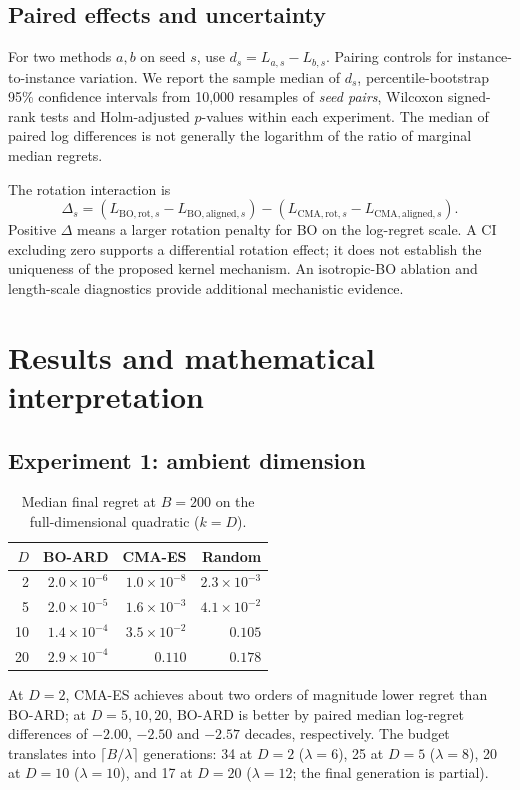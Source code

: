 \documentclass[11pt,a4paper]{article}
\begin{document}
\subsection{Paired effects and uncertainty}
For two methods $a,b$ on seed $s$, use $d_s=L_{a,s}-L_{b,s}$. Pairing controls for instance-to-instance variation. We report the sample median of $d_s$, percentile-bootstrap 95\% confidence intervals from 10,000 resamples of \emph{seed pairs}, Wilcoxon signed-rank tests and Holm-adjusted $p$-values within each experiment. The median of paired log differences is not generally the logarithm of the ratio of marginal median regrets.

The rotation interaction is
\begin{equation}\label{eq:interaction}
\Delta_s=(L_{\mathrm{BO,rot},s}-L_{\mathrm{BO,aligned},s})-(L_{\mathrm{CMA,rot},s}-L_{\mathrm{CMA,aligned},s}).
\end{equation}
Positive $\Delta$ means a larger rotation penalty for BO on the log-regret scale. A CI excluding zero supports a differential rotation effect; it does not establish the uniqueness of the proposed kernel mechanism. An isotropic-BO ablation and length-scale diagnostics provide additional mechanistic evidence.

\section{Results and mathematical interpretation}
\subsection{Experiment 1: ambient dimension}
\begin{table}[H]\centering\caption{Median final regret at $B=200$ on the full-dimensional quadratic ($k=D$).}\begin{tabular}{rrrr}\toprule $D$&BO-ARD&CMA-ES&Random\\\midrule 2&$2.0\times10^{-6}$&$1.0\times10^{-8}$&$2.3\times10^{-3}$\\5&$2.0\times10^{-5}$&$1.6\times10^{-3}$&$4.1\times10^{-2}$\\10&$1.4\times10^{-4}$&$3.5\times10^{-2}$&$0.105$\\20&$2.9\times10^{-4}$&$0.110$&$0.178$\\\bottomrule\end{tabular}\end{table}
At $D=2$, CMA-ES achieves about two orders of magnitude lower regret than BO-ARD; at $D=5,10,20$, BO-ARD is better by paired median log-regret differences of $-2.00$, $-2.50$ and $-2.57$ decades, respectively. The budget translates into $\lceil B/\lambda\rceil$ generations: 34 at $D=2$ ($\lambda=6$), 25 at $D=5$ ($\lambda=8$), 20 at $D=10$ ($\lambda=10$), and 17 at $D=20$ ($\lambda=12$; the final generation is partial).
\end{document}
